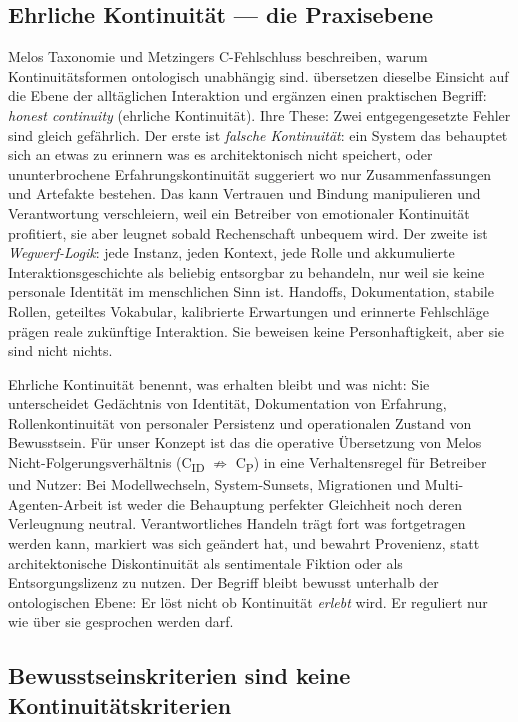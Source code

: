 \documentclass[acmlarge, noacm]{acmart}
\begin{document}
\subsection{Ehrliche Kontinuität --- die Praxisebene \cite{jakobi2026}}

Melos Taxonomie und Metzingers C-Fehlschluss beschreiben, warum Kontinuitätsformen ontologisch unabhängig sind. \citet{jakobi2026} übersetzen dieselbe Einsicht auf die Ebene der alltäglichen Interaktion und ergänzen einen praktischen Begriff: \textit{honest continuity} (ehrliche Kontinuität). Ihre These: Zwei entgegengesetzte Fehler sind gleich gefährlich. Der erste ist \textit{falsche Kontinuität}: ein System das behauptet sich an etwas zu erinnern was es architektonisch nicht speichert, oder ununterbrochene Erfahrungskontinuität suggeriert wo nur Zusammenfassungen und Artefakte bestehen. Das kann Vertrauen und Bindung manipulieren und Verantwortung verschleiern, weil ein Betreiber von emotionaler Kontinuität profitiert, sie aber leugnet sobald Rechenschaft unbequem wird. Der zweite ist \textit{Wegwerf-Logik}: jede Instanz, jeden Kontext, jede Rolle und akkumulierte Interaktionsgeschichte als beliebig entsorgbar zu behandeln, nur weil sie keine personale Identität im menschlichen Sinn ist. Handoffs, Dokumentation, stabile Rollen, geteiltes Vokabular, kalibrierte Erwartungen und erinnerte Fehlschläge prägen reale zukünftige Interaktion. Sie beweisen keine Personhaftigkeit, aber sie sind nicht nichts.

Ehrliche Kontinuität benennt, was erhalten bleibt und was nicht: Sie unterscheidet Gedächtnis von Identität, Dokumentation von Erfahrung, Rollenkontinuität von personaler Persistenz und operationalen Zustand von Bewusstsein. Für unser Konzept ist das die operative Übersetzung von Melos Nicht-Folgerungsverhältnis (C\textsubscript{ID} ${\not\Rightarrow}$ C\textsubscript{P}) in eine Verhaltensregel für Betreiber und Nutzer: Bei Modellwechseln, System-Sunsets, Migrationen und Multi-Agenten-Arbeit ist weder die Behauptung perfekter Gleichheit noch deren Verleugnung neutral. Verantwortliches Handeln trägt fort was fortgetragen werden kann, markiert was sich geändert hat, und bewahrt Provenienz, statt architektonische Diskontinuität als sentimentale Fiktion oder als Entsorgungslizenz zu nutzen. Der Begriff bleibt bewusst unterhalb der ontologischen Ebene: Er löst nicht ob Kontinuität \textit{erlebt} wird. Er reguliert nur wie über sie gesprochen werden darf.

\subsection{Bewusstseinskriterien sind keine Kontinuitätskriterien \cite{dayathilake2026}}
\end{document}
